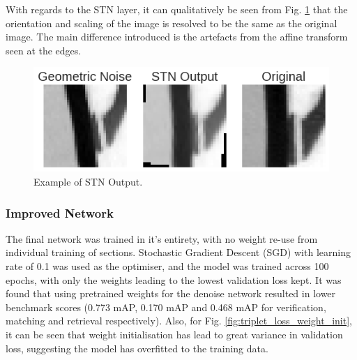 \documentclass[10pt,twocolumn,letterpaper]{article}
\begin{document}
 
With regards to the STN layer, it can qualitatively be seen from Fig. \ref{fig:stn_output} that the orientation and scaling of the image is resolved to be the same as the original image. The main difference introduced is the artefacts from the affine transform seen at the edges.
 
\begin{figure}[H]
\centering
  \includegraphics[width=0.85\linewidth]{report/figures/stn_out.png}
  \caption{Example of STN Output.}
  \label{fig:stn_output}
\end{figure}

 
\subsubsection{Improved Network}

The final network was trained in it's entirety, with no weight re-use from individual training of sections. Stochastic Gradient Descent (SGD) with learning rate of 0.1 was used as the optimiser, and the model was trained across 100 epochs, with only the weights leading to the lowest validation loss kept. It was found that using pretrained weights for the denoise network resulted in lower benchmark scores (0.773 mAP, 0.170 mAP and 0.468 mAP for verification, matching and retrieval respectively). Also, for Fig. \ref{fig:triplet_loss_weight_init}, it can be seen that weight initialisation has lead to great variance in validation loss, suggesting the model has overfitted to the training data.
\end{document}
